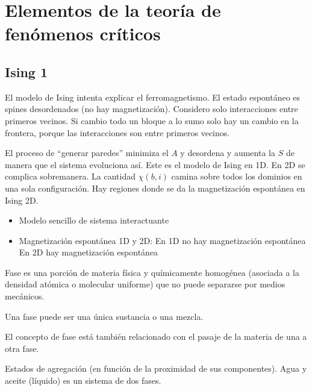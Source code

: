 \documentclass[10pt,oneside]{CBFT_book}
\begin{document}
\chapter{Elementos de la teoría de fenómenos críticos}


\section{Ising 1}

El modelo de Ising intenta explicar el ferromagnetismo. El estado espontáneo es spines desordenados
(no hay magnetización). Considero solo interacciones entre primeros vecinos.
Si cambio todo un bloque a lo sumo solo hay un cambio en la frontera, porque las interacciones son
entre primeros vecinos.

El proceso de ``generar paredes'' minimiza el $A$ y desordena y aumenta la $S$ de manera que el sistema
evoluciona así. Este es el modelo de Ising en 1D. En 2D se complica sobremanera.
La cantidad $\chi(b,i)$ camina sobre todos los dominios en una sola configuración.
Hay regiones donde se da la magnetización espontánea en Ising 2D.


\begin{itemize}
 \item Modelo sencillo de sistema interactuante
 \item Magnetización espontánea 1D y 2D:
 \subitem En 1D no hay magnetización espontánea
 \subitem En 2D hay magnetización espontánea
\end{itemize}

Fase es una porción de materia física y químicamente homogénea (asociada a la densidad atómica o molecular
uniforme) que no puede separarse por medios mecánicos.

Una fase puede ser una única sustancia o una mezcla.

El concepto de fase está también relacionado con el pasaje de la materia de una a otra fase.


Estados de agregación (en función de la proximidad de sus componentes). Agua y aceite (líquido) es un sistema de dos 
fases.
\end{document}
